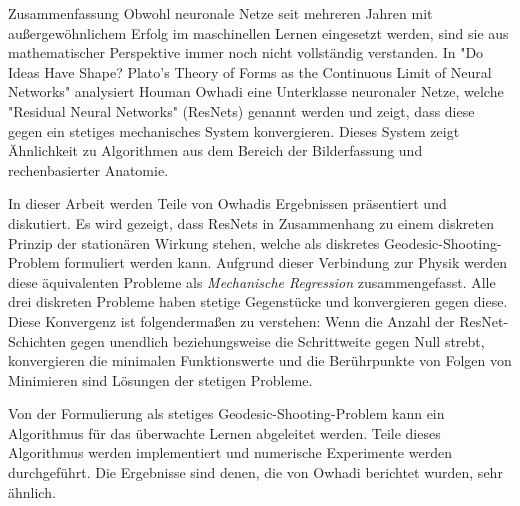 \pagebreak
\begin{polyabstract}{Zusammenfassung}
	Obwohl neuronale Netze seit mehreren Jahren mit außergewöhnlichem Erfolg im maschinellen Lernen eingesetzt werden, sind sie aus mathematischer Perspektive immer noch nicht vollständig verstanden.
	In "Do Ideas Have Shape? Plato's Theory of Forms as the Continuous Limit of Neural Networks" analysiert Houman Owhadi eine Unterklasse neuronaler Netze, welche "Residual Neural Networks" (ResNets) genannt werden und zeigt, dass diese gegen ein stetiges mechanisches System konvergieren.
	Dieses System zeigt Ähnlichkeit zu Algorithmen aus dem Bereich der Bilderfassung und rechenbasierter Anatomie.
	
	In dieser Arbeit werden Teile von Owhadis Ergebnissen präsentiert und diskutiert.
	Es wird gezeigt, dass ResNets in Zusammenhang zu einem diskreten Prinzip der stationären Wirkung stehen, welche als diskretes Geodesic-Shooting-Problem formuliert werden kann.
	Aufgrund dieser Verbindung zur Physik werden diese äquivalenten Probleme als \emph{Mechanische Regression} zusammengefasst.
	Alle drei diskreten Probleme haben stetige Gegenstücke und konvergieren gegen diese.
	Diese Konvergenz ist folgendermaßen zu verstehen:
	Wenn die Anzahl der ResNet-Schichten gegen unendlich beziehungsweise die Schrittweite gegen Null strebt, konvergieren die minimalen Funktionswerte und die Berührpunkte von Folgen von Minimieren sind Lösungen der stetigen Probleme.
	
	Von der Formulierung als stetiges Geodesic-Shooting-Problem kann ein Algorithmus für das überwachte Lernen abgeleitet werden.
	Teile dieses Algorithmus werden implementiert und numerische Experimente werden durchgeführt.
	Die Ergebnisse sind denen, die von Owhadi berichtet wurden, sehr ähnlich.
\end{polyabstract}

